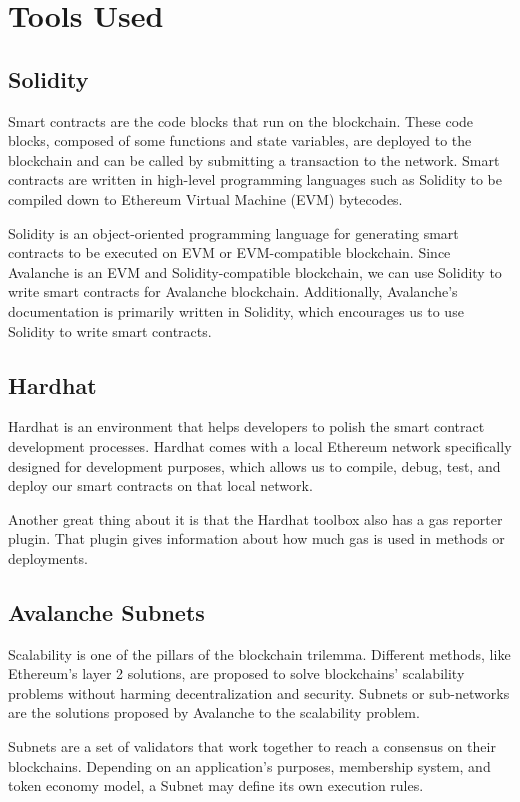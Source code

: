 \documentclass[a4paper,12pt]{report}
\begin{document}
\section{Tools Used}
\subsection{Solidity}

Smart contracts are the code blocks that run on the blockchain. These code blocks, composed of some functions and state variables, are deployed to the blockchain and can be called by submitting a transaction to the network. Smart contracts are written in high-level programming languages such as Solidity to be compiled down to Ethereum Virtual Machine (EVM) bytecodes. 

Solidity is an object-oriented programming language for generating smart contracts to be executed on EVM or EVM-compatible blockchain. Since Avalanche is an EVM and Solidity-compatible blockchain, we can use Solidity to write smart contracts for Avalanche blockchain. Additionally, Avalanche’s documentation is primarily written in Solidity, which encourages us to use Solidity to write smart contracts. 

\subsection{Hardhat}
Hardhat is an environment that helps developers to polish the smart contract development processes. Hardhat comes with a local Ethereum network specifically designed for development purposes, which allows us to compile, debug, test, and deploy our smart contracts on that local network. 

Another great thing about it is that the Hardhat toolbox also has a gas reporter plugin. That plugin gives information about how much gas is used in methods or deployments. 
\newpage
\subsection{Avalanche Subnets}
Scalability is one of the pillars of the blockchain trilemma. Different methods, like Ethereum's layer 2 solutions, are proposed to solve blockchains' scalability problems without harming decentralization and security. Subnets or sub-networks are the solutions proposed by Avalanche to the scalability problem.

Subnets are a set of validators that work together to reach a consensus on their blockchains. Depending on an application's purposes, membership system, and token economy model, a Subnet may define its own execution rules. 
\end{document}
